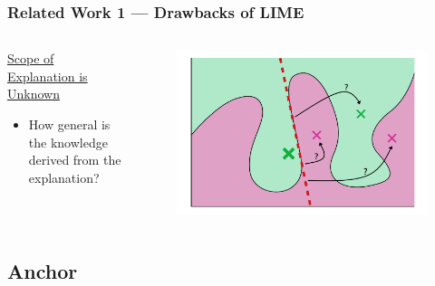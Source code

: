 \documentclass[aspectratio=169]{slide-en}
\begin{document}
\begin{frame}
  \frametitle{Related Work 1 — Drawbacks of LIME}
  \begin{columns}[]
    \begin{column}{0.4\textwidth}
      \underline{Scope of Explanation is Unknown}

      \bigskip
      \begin{itemize}
        \item How general is the knowledge derived from the explanation?
      \end{itemize}
    \end{column}
    \begin{column}{0.45\textwidth}
      \begin{figure}
        \includegraphics[width=\textwidth]{src/lime_drawback}
      \end{figure}
    \end{column}
  \end{columns}
\end{frame}

\subsection{Anchor}
\end{document}
